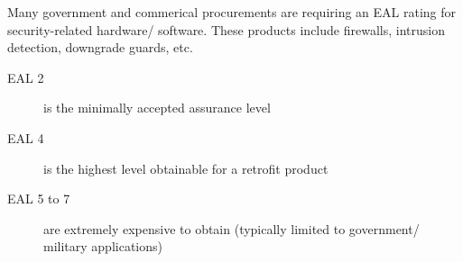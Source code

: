 Many government and commerical procurements are requiring an EAL rating for security-related hardware/ software. These products include firewalls, intrusion detection, downgrade guards, etc.
\begin{description}
    \item[EAL 2] is the minimally accepted assurance level
    \item[EAL 4] is the highest level obtainable for a retrofit product
    \item[EAL 5 to 7] are extremely expensive to obtain (typically limited to government/ military applications)
\end{description}